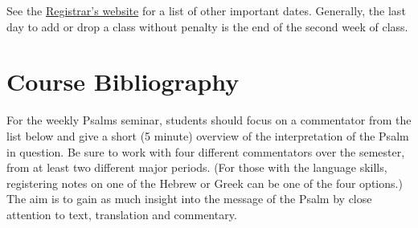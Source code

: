\documentclass[titlepage]{article}
\begin{document}
See the \href{http://www.tyndale.ca/registrar/important-dates}{%
Registrar's website} for a list of other important dates. Generally, the
last day to add or drop a class without penalty is the end of the second
week of class.

\section{Course Bibliography}
\label{bibliography}

For the weekly Psalms seminar, students should focus on a commentator
from the list below and give a short (5 minute) overview of the
interpretation of the Psalm in question. Be sure to work with four
different commentators over the semester, from at least two different
major periods. (For those with the language skills, registering notes on
one of the Hebrew or Greek can be one of the four options.) The aim is
to gain as much insight into the message of the Psalm by close attention
to text, translation and commentary.
\end{document}
